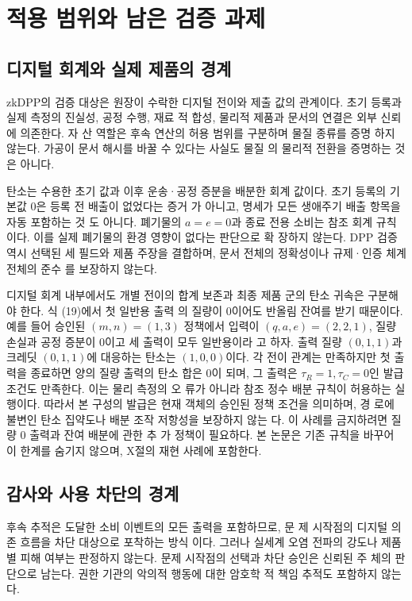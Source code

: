 \section{적용 범위와 남은 검증 과제}

\subsection{디지털 회계와 실제 제품의 경계}
zkDPP의 검증 대상은 원장이 수락한 디지털 전이와 제출 값의
관계이다. 초기 등록과 실제 측정의 진실성, 공정 수행, 재료 적
합성, 물리적 제품과 문서의 연결은 외부 신뢰에 의존한다. 자
산 역할은 후속 연산의 허용 범위를 구분하며 물질 종류를 증명
하지 않는다. 가공이 문서 해시를 바꿀 수 있다는 사실도 물질
의 물리적 전환을 증명하는 것은 아니다.

탄소는 수용한 초기 값과 이후 운송·공정 증분을 배분한 회계
값이다. 초기 등록의 기본값 0은 등록 전 배출이 없었다는 증거
가 아니고, 명세가 모든 생애주기 배출 항목을 자동 포함하는 것
도 아니다. 폐기물의 \(a=e=0\)과 종료 전용 소비는 참조 회계
규칙이다. 이를 실제 폐기물의 환경 영향이 없다는 판단으로 확
장하지 않는다. DPP 검증 역시 선택된 세 필드와 제품 주장을
결합하며, 문서 전체의 정확성이나 규제·인증 체계 전체의 준수
를 보장하지 않는다.

디지털 회계 내부에서도 개별 전이의 합계 보존과 최종 제품
군의 탄소 귀속은 구분해야 한다. 식 (19)에서 첫 일반용 출력
의 질량이 0이어도 반올림 잔여를 받기 때문이다. 예를 들어
승인된 \((m,n)=(1,3)\) 정책에서 입력이 \((q,a,e)=(2,2,1)\),
질량 손실과 공정 증분이 0이고 세 출력이 모두 일반용이라
고 하자. 출력 질량 \((0,1,1)\)과 크레딧 \((0,1,1)\)에 대응하는
탄소는 \((1,0,0)\)이다. 각 전이 관계는 만족하지만 첫 출력을
종료하면 양의 질량 출력의 탄소 합은 0이 되며, 그 출력은
\(τ_{R}=1,τ_{C}=0\)인 발급 조건도 만족한다. 이는 물리 측정의 오
류가 아니라 참조 정수 배분 규칙이 허용하는 실행이다. 따라서
본 구성의 발급은 현재 객체의 승인된 정책 조건을 의미하며, 경
로에 불변인 탄소 집약도나 배분 조작 저항성을 보장하지 않는
다. 이 사례를 금지하려면 질량 0 출력과 잔여 배분에 관한 추
가 정책이 필요하다. 본 논문은 기존 규칙을 바꾸어 이 한계를
숨기지 않으며, X절의 재현 사례에 포함한다.

\subsection{감사와 사용 차단의 경계}
후속 추적은 도달한 소비 이벤트의 모든 출력을 포함하므로, 문
제 시작점의 디지털 의존 흐름을 차단 대상으로 포착하는 방식
이다. 그러나 실세계 오염 전파의 강도나 제품별 피해 여부는
판정하지 않는다. 문제 시작점의 선택과 차단 승인은 신뢰된 주
체의 판단으로 남는다. 권한 기관의 악의적 행동에 대한 암호학
적 책임 추적도 포함하지 않는다.

